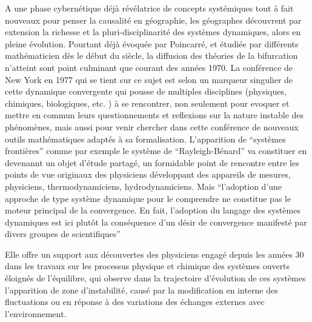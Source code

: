 A une phase cybernétique déjà révélatrice de concepts systémiques tout à fait nouveaux pour penser la causalité en géographie, les géographes découvrent par extension la richesse et la pluri-disciplinarité des systèmes dynamiques, alors en pleine évolution. Pourtant déjà évoquée par Poincarré, et étudiée par différents mathématicien dès le début du siècle, la diffusion des théories de la bifurcation n'atteint sont point culminant que courant des années 1970. La conférence de New York en 1977 qui se tient sur ce sujet est selon \textcite{Dahan1991} un marqueur singulier de cette dynamique convergente qui pousse de multiples disciplines (physiques, chimiques, biologiques, etc. ) à se rencontrer, non seulement pour evoquer et mettre en commun leurs questionnements et reflexions sur la nature instable des phénomènes, mais aussi pour venir chercher dans cette conférence de nouveaux outils mathématiques adaptés à sa formalisation. L'apparition de \enquote{systèmes frontières} comme par exemple le système de \enquote{Rayleigh-Bénard} va constituer en devenannt un objet d'étude partagé, un formidable point de rencontre entre les points de vue originaux des physiciens développant des appareils de mesures, physiciens, thermodynamiciens, hydrodynamiciens. Mais \enquote{l’adoption d’une approche de type système dynamique pour le comprendre ne constitue pas le moteur principal de la convergence. En fait, l’adoption du langage des systèmes dynamiques est ici plutôt la conséquence d’un désir de convergence manifesté par divers groupes de scientifiques} \textcite{Dahan1991}





Elle offre un support aux découvertes des physiciens engagé depuis les années 30 dans les travaux sur les processus physique et chimique des systèmes ouverts éloignés de l'équilibre, qui observe dans la trajectoire d'évolution de ces systèmes l'apparition de zone d'instabilité, causé par la modification en interne des fluctuations ou en réponse à des variations des échanges externes avec l'environnement.

